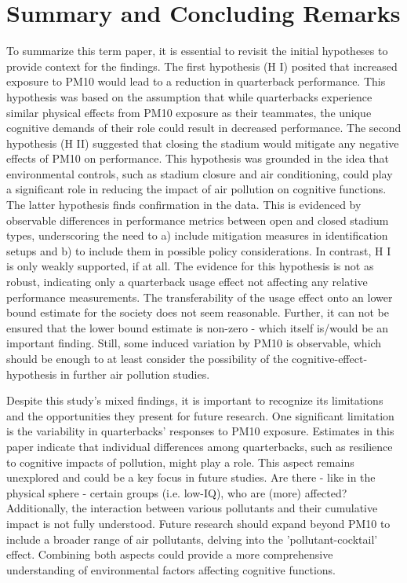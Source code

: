 \documentclass[12pt,a4paper]{article}
\begin{document}
{\section{Summary and Concluding Remarks}
\label{6}
To summarize this term paper, it is essential to revisit the initial hypotheses to provide context for the findings. The first hypothesis (H I) posited that increased exposure to PM10 would lead to a reduction in quarterback performance. This hypothesis was based on the assumption that while quarterbacks experience similar physical effects from PM10 exposure as their teammates, the unique cognitive demands of their role could result in decreased performance. The second hypothesis (H II) suggested that closing the stadium would mitigate any negative effects of PM10 on performance. This hypothesis was grounded in the idea that environmental controls, such as stadium closure and air conditioning, could play a significant role in reducing the impact of air pollution on cognitive functions. The latter hypothesis finds confirmation in the data. This is evidenced by observable differences in performance metrics between open and closed stadium types, underscoring the need to a) include mitigation measures in identification setups and b) to include them in possible policy considerations. In contrast, H I is only weakly supported, if at all. The evidence for this hypothesis is not as robust, indicating only a quarterback usage effect not affecting any relative performance measurements. The transferability of the usage effect onto an lower bound estimate for the society does not seem reasonable. Further, it can not be ensured that the lower bound estimate is non-zero - which itself is/would be an important finding. Still, some induced variation by PM10 is observable, which should be enough to at least consider the possibility of the cognitive-effect-hypothesis in further air pollution studies. 


Despite this study's mixed findings, it is important to recognize its limitations and the opportunities they present for future research. One significant limitation is the variability in quarterbacks' responses to PM10 exposure. Estimates in this paper indicate that individual differences among quarterbacks, such as resilience to cognitive impacts of pollution, might play a role. This aspect remains unexplored and could be a key focus in future studies. Are there - like in the physical sphere - certain groups (i.e. low-IQ), who are (more) affected? Additionally, the interaction between various pollutants and their cumulative impact is not fully understood. Future research should expand beyond PM10 to include a broader range of air pollutants, delving into the 'pollutant-cocktail' effect. Combining both aspects could provide a more comprehensive understanding of environmental factors affecting cognitive functions.

}
\end{document}
